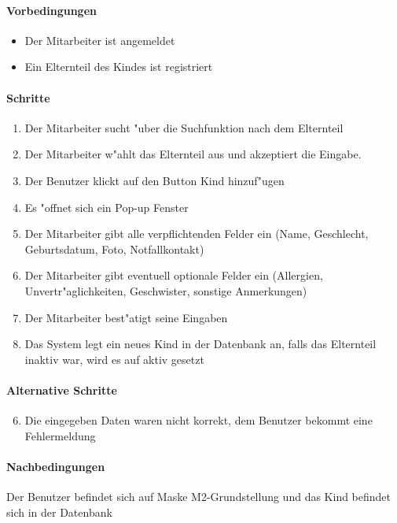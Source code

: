   \paragraph{Vorbedingungen}
  \begin{itemize}
   \item Der Mitarbeiter ist angemeldet
   \item Ein Elternteil des Kindes ist registriert
  \end{itemize}

  \paragraph{Schritte}
  \begin{enumerate}
   \item Der Mitarbeiter sucht "uber die Suchfunktion nach dem Elternteil
   \item Der Mitarbeiter w"ahlt das Elternteil aus und akzeptiert die Eingabe.
   \item Der Benutzer klickt auf den Button \dq Kind hinzuf"ugen\dq
   \item Es "offnet sich ein Pop-up Fenster
   \item Der Mitarbeiter gibt alle verpflichtenden Felder ein (Name, Geschlecht, Geburtsdatum, Foto, Notfallkontakt)
   \item Der Mitarbeiter gibt eventuell optionale Felder ein (Allergien, Unvertr"aglichkeiten, Geschwister, sonstige Anmerkungen)
   \item Der Mitarbeiter best"atigt seine Eingaben
   \item Das System legt ein neues Kind in der Datenbank an, falls das Elternteil inaktiv war, wird es auf aktiv gesetzt
  \end{enumerate}

  \paragraph{Alternative Schritte}
  \begin{enumerate}
  \setcounter{enumi}{5}
   \item Die eingegeben Daten waren nicht korrekt, dem Benutzer bekommt eine Fehlermeldung
  \end{enumerate}

  \paragraph{Nachbedingungen}
  Der Benutzer befindet sich auf Maske M2-Grundstellung und das Kind befindet sich in der Datenbank

